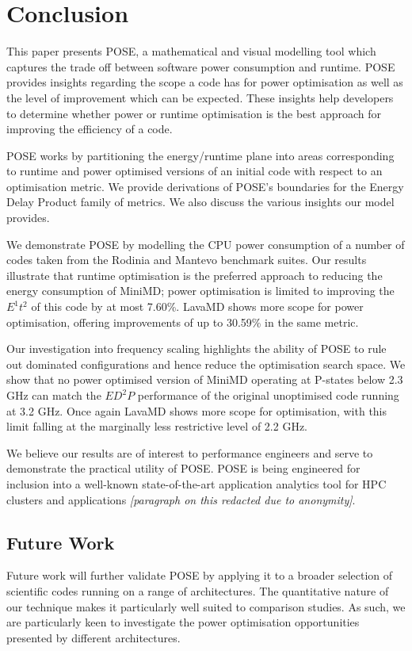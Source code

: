 \section{Conclusion}
\label{sec:conclusion}
\noindent
This paper presents POSE, a mathematical and visual modelling tool which captures the trade off between software power consumption and runtime.
POSE provides insights regarding the scope a code has for power optimisation as well as the level of improvement which can be expected.
These insights help developers to determine whether power or runtime optimisation is the best approach for improving the efficiency of a code.

POSE works by partitioning the energy/runtime plane into areas corresponding to runtime and power optimised versions of an initial code with respect to an optimisation metric.
We provide derivations of POSE's boundaries for the Energy Delay Product family of metrics.
We also discuss the various insights our model provides.

We demonstrate POSE by modelling the CPU power consumption of a number of codes taken from the Rodinia and Mantevo benchmark suites.  
Our results illustrate that runtime optimisation is the preferred approach to reducing the energy consumption of MiniMD; power optimisation is limited to improving the $E^1t^2$ of this code by at most 7.60\%.
LavaMD shows more scope for power optimisation, offering improvements of up to 30.59\% in the same metric. 

Our investigation into frequency scaling highlights the ability of POSE to rule out dominated configurations and hence reduce the optimisation search space.
We show that no power optimised version of MiniMD operating at P-states below 2.3 GHz can match the $ED^2P$ performance of the original unoptimised code running at 3.2 GHz.
Once again LavaMD shows more scope for optimisation, with this limit falling at the marginally less restrictive level of 2.2 GHz.

We believe our results are of interest to performance engineers and serve to demonstrate the practical utility of POSE.
POSE is being engineered for inclusion into a well-known state-of-the-art application analytics tool for HPC clusters and applications \textit{[paragraph on this redacted due to anonymity]}.

\subsection*{Future Work}
\noindent
Future work will further validate POSE by applying it to a broader selection of scientific codes running on a range of architectures.
The quantitative nature of our technique makes it particularly well suited to comparison studies.
As such, we are particularly keen to investigate the power optimisation opportunities presented by different architectures.

